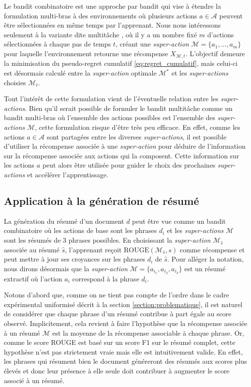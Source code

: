 Le bandit combinatoire est une approche par bandit qui vise à étendre
la formulation multi-bras à des environnements où plusieurs actions
$a \in \mathcal{A}$ peuvent être sélectionnées
en même temps par l'apprenant.
Nous nous intéressons seulement à la variante dite multitâche \citep{banditalgs}, où
il y a un nombre fixé $m$ d'actions sélectionnées à
chaque pas de temps $t$, créant une \textit{super-action} $\mathcal{M} = \{a_1, ..., a_m\}$
pour laquelle l'environnement retourne une récompense $X_{\mathcal{M}, t}$.
L'objectif demeure la minimisation du pseudo-regret cumulatif \eqref{eq:regret_cumulatif}, 
mais celui-ci est désormais calculé entre
la \textit{super-action} optimale $\mathcal{M}^*$ et les \textit{super-actions}
choisies $\mathcal{M}_t$.

Tout l'intérêt de cette formulation vient de l'éventuelle relation entre les \textit{super-actions}.
Bien qu'il serait possible de formuler le bandit multitâche comme un bandit multi-bras où l'ensemble des
actions possibles est l'ensemble des \textit{super-actions} $\mathcal{M}$, cette formulation
risque d'être très peu efficace.
En effet, comme les actions $a \in \mathcal{A}$ sont partagées entre les diverses \textit{super-actions},
il est possible d'utiliser la récompense associée à une \textit{super-action} pour
déduire de l'information sur la récompense associée aux actions qui la composent.
Cette information sur les actions $a$ peut alors être utilisée pour guider le choix des
prochaines \textit{super-actions} et accélérer l'apprentissage.

\subsection{Application à la génération de résumé}

La génération du résumé d'un document $d$ peut être vue comme un bandit combinatoire où
les actions de base sont les phrases $d_i$ et les \textit{super-actions} $\mathcal{M}$
sont les résumés de 3 phrases possibles.
En choisissant la \textit{super-action} $\mathcal{M}_{\hat{s}}$ associée au résumé $\hat{s}$,
l'apprenant reçoit $\text{ROUGE}(\mathcal{M}_{\hat{s}}, s)$ comme récompense et peut mettre à jour ses
croyances sur les phrases $d_i$ de $\hat{s}$.
Pour alléger la notation, nous dirons désormais que la \textit{super-action} 
$\mathcal{M} = \{a_{i_1},a_{i_2},a_{i_3}\}$ est un résumé extractif 
où l'action $a_i$ correspond à la phrase $d_i$.

Notons d'abord que, comme on ne tient pas compte de l'ordre dans le cadre 
expérimental uniformisé décrit à la section \ref{section:problematique},
il est naturel de considérer que chaque phrase d'un résumé contribue à part égale
au score observé.
Implicitement, cela revient à faire l'hypothèse que la récompense associée à un résumé
$\mathcal{M}$ est la moyenne de la récompense associable à chaque phrase.
Or, comme le score ROUGE est basé sur un score F1 sur le résumé complet, cette hypothèse
n'est pas strictement vraie mais elle est intuitivement valide.
En effet, les phrases qui résument bien le document généreront des résumés aux scores
plus élevés et donc leur présence à elle seule doit contribuer à augmenter le score
associé à un résumé.


